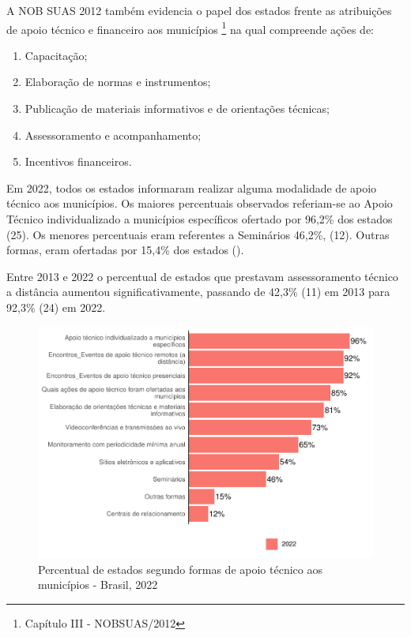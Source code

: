 \documentclass[
  brazilian]{report}
\providecommand{\tightlist}{%
  \setlength{\itemsep}{0pt}\setlength{\parskip}{0pt}}
\begin{document}
A NOB SUAS 2012 também evidencia o papel dos estados frente as
atribuições de apoio técnico e financeiro aos municípios
\footnote{Capítulo III - NOBSUAS/2012} na qual compreende ações de:

\begin{enumerate}
\def\labelenumi{\Roman{enumi})}
\tightlist
\item
  Capacitação;
\item
  Elaboração de normas e instrumentos;
\item
  Publicação de materiais informativos e de orientações técnicas;
\item
  Assessoramento e acompanhamento;
\item
  Incentivos financeiros.
\end{enumerate}

Em 2022, todos os estados informaram realizar alguma modalidade de apoio
técnico aos municípios. Os maiores percentuais observados referiam-se ao
Apoio Técnico individualizado a municípios específicos ofertado por
96,2\% dos estados (25). Os menores percentuais eram referentes a
Seminários 46,2\%, (12). Outras formas, eram ofertadas por 15,4\% dos
estados ().

Entre 2013 e 2022 o percentual de estados que prestavam assessoramento
técnico a distância aumentou significativamente, passando de 42,3\% (11)
em 2013 para 92,3\% (24) em 2022.

\begin{figure}
\includegraphics{Censo-SUAS-2022_files/figure-latex/estados-formas-apoio-1} \caption[Percentual de estados segundo formas de apoio técnico aos municípios - Brasil, 2022]{Percentual de estados segundo formas de apoio técnico aos municípios - Brasil, 2022}\label{fig:estados-formas-apoio}
\end{figure}
\end{document}

